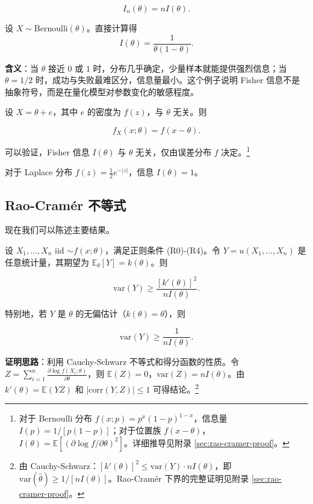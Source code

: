 \[
I_n(\theta) = n I(\theta).
\label{eq:fisher-information-sample}
\]

\begin{example}\label{ex:bernoulli-fisher-info}
设 $X \sim \text{Bernoulli}(\theta)$。直接计算得
\[
I(\theta)=\frac{1}{\theta(1-\theta)}.
\]

\textbf{含义}：当 $\theta$ 接近 $0$ 或 $1$ 时，分布几乎确定，少量样本就能提供强烈信息；当 $\theta=1/2$ 时，成功与失败最难区分，信息量最小。这个例子说明 Fisher 信息不是抽象符号，而是在量化模型对参数变化的敏感程度。
\end{example}

\begin{example}\label{ex:location-family-fisher}
设 $X = \theta + e$，其中 $e$ 的密度为 $f(z)$，与 $\theta$ 无关。则

\[
f_X(x;\theta) = f(x-\theta).
\]

可以验证，Fisher 信息 $I(\theta)$ 与 $\theta$ 无关，仅由误差分布 $f$ 决定。\footnote{对于 Bernoulli 分布 $f(x;p) = p^x(1-p)^{1-x}$，信息量 $I(p) = 1/[p(1-p)]$；对于位置族 $f(x-\theta)$，$I(\theta) = \mathbb{E}[(\partial\log f/\partial\theta)^2]$。详细推导见附录 \cref{sec:rao-cramer-proof}。}

对于 Laplace 分布 $f(z) = \frac{1}{2}e^{-|z|}$，信息 $I(\theta) = 1$。
\end{example}

\subsection{Rao-Cramér 不等式}

现在我们可以陈述主要结果。

\begin{theorem}\label{th:rao-cramer-bound}
设 $X_1, \ldots, X_n$ iid $\sim f(x;\theta)$，满足正则条件 (R0)-(R4)。令 $Y = u(X_1, \ldots, X_n)$ 是任意统计量，其期望为 $\mathbb{E}_\theta[Y] = k(\theta)$。则

\[
\text{var}(Y) \geq \frac{[k'(\theta)]^2}{n I(\theta)}.
\label{eq:rao-cramer-bound}
\]

特别地，若 $Y$ 是 $\theta$ 的无偏估计（$k(\theta) = \theta$），则

\[
\text{var}(Y) \geq \frac{1}{n I(\theta)}.
\label{eq:rao-cramer-bound-unbiased}
\]
\end{theorem}

\textbf{证明思路}：利用 Cauchy-Schwarz 不等式和得分函数的性质。令 $Z = \sum_{i=1}^n \frac{\partial \log f(X_i;\theta)}{\partial \theta}$，则 $\mathbb{E}(Z) = 0$，$\text{var}(Z) = nI(\theta)$。由 $k'(\theta) = \mathbb{E}(YZ)$ 和 $|\text{corr}(Y,Z)| \leq 1$ 可得结论。\footnote{由 Cauchy-Schwarz：$[k'(\theta)]^2 \leq \text{var}(Y) \cdot nI(\theta)$，即 $\text{var}(\widehat{\theta}) \geq 1/[nI(\theta)]$。Rao-Cramér 下界的完整证明见附录 \cref{sec:rao-cramer-proof}。}

